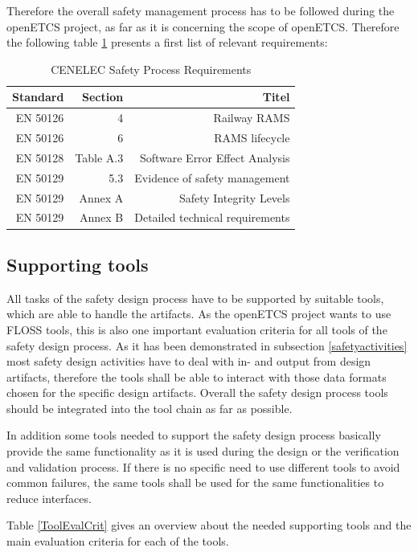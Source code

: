 \documentclass{template/openetcs_article}
\begin{document}
Therefore the overall safety management process has to be followed during the openETCS project, as far as it is concerning the scope of openETCS. Therefore the following table \ref{tab:Safety Process Requirements} presents a first list of relevant requirements:

\begin{table}[htbp]
  \centering
  \caption{CENELEC Safety Process Requirements}
    \begin{tabular}{r|r|r}
    Standard & Section & Titel \\
    \hline
     EN 50126 & 4 & Railway RAMS  \\ 
    EN 50126 & 6 & RAMS lifecycle \\
     EN 50128 & Table A.3 & Software Error Effect Analysis\\
    EN 50129 & 5.3 & Evidence of safety management \\
    EN 50129 & Annex A & Safety Integrity Levels \\
    EN 50129 & Annex B & Detailed technical requirements \\
    \end{tabular}%
  \label{tab:Safety Process Requirements}%
\end{table}%

\subsection{Supporting tools}

All tasks of the safety design process have to be supported by suitable tools, which are able to handle the artifacts. As the openETCS project wants to use FLOSS tools, this is also one important evaluation criteria for all tools of the safety design process. As it has been demonstrated in subsection \ref{safetyactivities} most safety design activities have to deal with in- and output from design artifacts, therefore the tools shall be able to interact with those data formats chosen for the specific design artifacts. Overall the safety design process tools should be integrated into the tool chain as far as possible.  

In addition some tools needed to support the safety design process basically provide the same functionality as it is used during the design or the verification and validation process. If there is no specific need to use different tools to avoid common failures, the same tools shall be used for the same functionalities to reduce interfaces.

Table \ref{ToolEvalCrit} gives an overview about the needed supporting tools and the main evaluation criteria for each of the tools.
\end{document}
